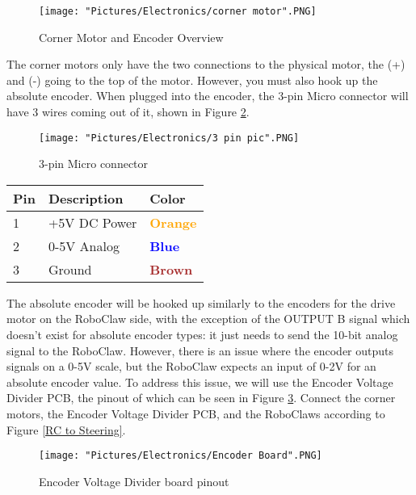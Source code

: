 \documentclass[12pt]{article}
\begin{document}
\begin{figure}[H]
  	\centering
    	\texttt{[image: "Pictures/Electronics/corner motor".PNG]}
 	\caption{Corner Motor and Encoder Overview}
	\label{corner motors over}
\end{figure}

 The corner motors only have the two connections to the physical motor, the (+) and (-) going to the top of the motor. However, you must also hook up the absolute encoder. When plugged into the encoder, the 3-pin Micro connector will have 3 wires coming out of it, shown in Figure \ref{3pin}.


\bigskip 

\begin{figure}[H]
 	\centering
	\texttt{[image: "Pictures/Electronics/3 pin pic".PNG]}
 	\caption{3-pin Micro connector}
	\label{3pin}
\end{figure}

\bigskip
\begin{tabular}[3] {| p{3cm} | p{7cm} | p{3cm} | }
	\hline
	\textbf{Pin} & \textbf{Description} & \textbf{Color} \\ \hline
	1 & +5V DC Power & \textcolor{orange}{\textbf{Orange}} \\ \hline
	2 & 0-5V Analog & \textcolor{blue}{\textbf{Blue}} \\ \hline
	3 & Ground & \textcolor{brown}{\textbf{Brown}} \\ \hline
\end{tabular}


The absolute encoder will be hooked up similarly to the encoders for the drive motor on the RoboClaw side, with the exception of the OUTPUT B signal which doesn't exist for absolute encoder types: it just needs to send the 10-bit analog signal to the RoboClaw. However, there is an issue where the encoder outputs signals on a 0-5V scale, but the RoboClaw expects an input of 0-2V for an absolute encoder value. To address this issue, we will use the Encoder Voltage Divider PCB, the pinout of which can be seen in Figure \ref{vd pinout}. Connect the corner motors, the Encoder Voltage Divider PCB, and the RoboClaws according to Figure \ref{RC to Steering}.

\begin{figure}[H]
 	\centering
	\texttt{[image: "Pictures/Electronics/Encoder Board".PNG]}
 	\caption{Encoder Voltage Divider board pinout}
	\label{vd pinout}
\end{figure}
\end{document}
